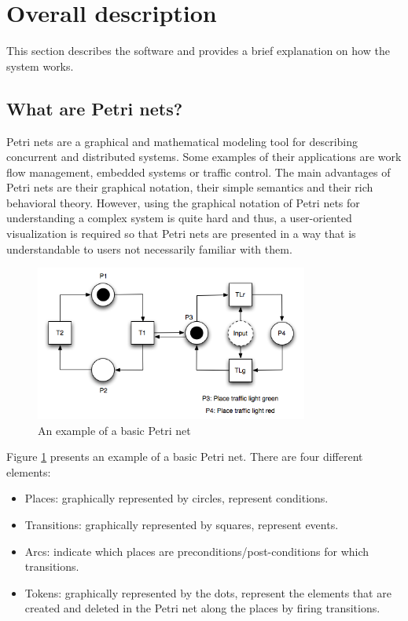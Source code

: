 \section{Overall description}

This section describes the software and provides a brief explanation on how the system works.

\subsection{What are Petri nets?}

Petri nets are a graphical and mathematical modeling tool for describing concurrent and distributed systems. Some examples of their applications are work flow management, embedded systems or traffic control. The main advantages of Petri nets are their graphical notation, their simple semantics and their rich behavioral theory. However, using the graphical notation of Petri nets for understanding a complex system is quite hard and thus, a user-oriented visualization is required so that Petri nets are presented in a way that is understandable to users not necessarily familiar with them.


\begin{figure}[htp]
\begin{center}
  \includegraphics[width=0.8\textwidth]{image/petrinet_diagram_2.png}
  \caption{An example of a basic Petri net}
  \label{fig:petrinet}
\end{center}
\end{figure}

Figure \ref{fig:petrinet} presents an example of a basic Petri net. There are four different elements:

\begin{itemize}
\item Places: graphically represented by circles, represent conditions.
\item Transitions: graphically represented by squares, represent events.
\item Arcs: indicate which places are preconditions/post-conditions for which transitions.
\item Tokens: graphically represented by the dots, represent the elements that are created and deleted in the Petri net along the places by firing transitions.
\end{itemize}


